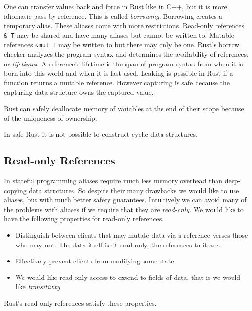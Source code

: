 \documentclass{article}
\begin{document}
One can transfer values back and force in Rust like in C++, but it is more idiomatic pass by reference.
This is called \textit{borrowing}.
Borrowing creates a temporary alias.
These aliases come with more restrictions.
Read-only references \texttt{\& T} may be shared and have many aliases but cannot be written to.
Mutable references \texttt{\&mut T} may be written to but there may only be one.
Rust's borrow checker analyzes the program syntax and determines the availability of references, or \textit{lifetimes}.
A reference's lifetime is the span of program syntax from when it is born into this world and when it is last used.
Leaking is possible in Rust if a function returns a mutable reference.
However capturing is safe because the capturing data structure owns the captured value.

\begin{remark}\label{rustcoolmem}
  Rust can safely deallocate memory of variables at the end of their scope because of the uniqueness of ownership.
\end{remark}

\begin{remark}\label{rusttree}
  In safe Rust it is not possible to construct cyclic data structures.
\end{remark}

\subsection{Read-only References}

In stateful programming aliases require much less memory overhead than deep-copying data structures.
So despite their many drawbacks we would like to use aliases, but with much better safety guarantees.
Intuitively we can avoid many of the problems with aliases if we require that they are \textit{read-only}.
We would like to have the following properties for read-only references.
\begin{itemize}
\item Distinguish between clients that may mutate data via a reference verses those who may not. The data itself isn't read-only, the references to it are.
\item Effectively prevent clients from modifying some state.
\item We would like read-only access to extend to fields of data, that is we would like \textit{transitivity}.
\end{itemize}

Rust's read-only references satisfy these properties.
\end{document}
